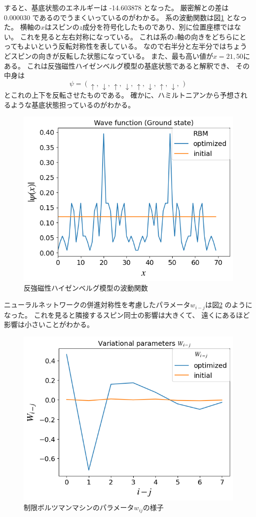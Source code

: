 \documentclass[twocolumn,10pt,dvipdfmx,a4paper]{jsarticle}
\begin{document}
すると、基底状態のエネルギーは -14.603878 となった。
厳密解との差は 0.000030 であるのでうまくいっているのがわかる。
系の波動関数は図\ref{fig:02} となった。
横軸の\(x\)はスピンの\(z\)成分を符号化したものであり、別に位置座標ではない。
これを見ると左右対称になっている。
これは系の\(z\)軸の向きをどちらにとってもよいという反転対称性を表している。
なので右半分と左半分ではちょうどスピンの向きが反転した状態になっている。
また、最も高い値が\(x=21, 50\)にある。
これは反強磁性ハイゼンベルグ模型の基底状態であると解釈でき、
その中身は
\begin{equation}
    \psi = (\uparrow,\,\downarrow,\,\uparrow,\,\downarrow,\,\uparrow,\,\downarrow,\,\uparrow,\,\downarrow,\,)
\end{equation}
とこれの上下を反転させたものである。
確かに、ハミルトニアンから予想されるような基底状態担っているのがわかる。
\begin{figure}
    \centering
    \includegraphics[width=0.9\columnwidth]{02.png}
    \caption{反強磁性ハイゼンベルグ模型の波動関数}
    \label{fig:02}
\end{figure}

ニューラルネットワークの併進対称性を考慮したパラメータ\(w_{i-j}\)は図\ref{fig:03}
のようになった。
これを見ると隣接するスピン同士の影響は大きくて、
遠くにあるほど影響は小さいことがわかる。
\begin{figure}
    \centering
    \includegraphics[width=0.9\columnwidth]{03.png}
    \caption{制限ボルツマンマシンのパラメータ\(w_{ij}\)の様子}
    \label{fig:03}
\end{figure}
\end{document}
